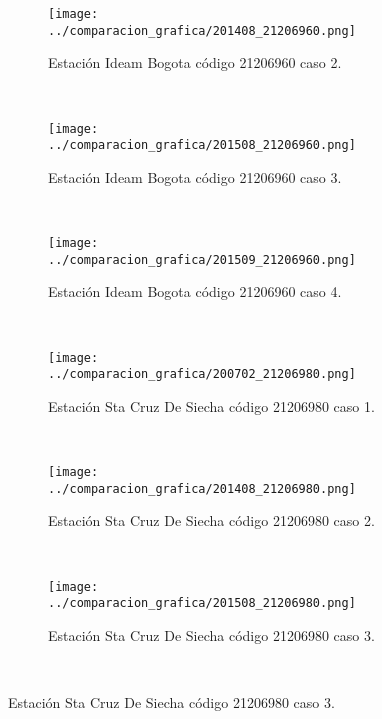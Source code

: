 \begin{figure}[H]
\centering
\begin{subfigure}[normla]{0.4\textwidth}
\caption{Estación Ideam Bogota código 21206960 caso 2.}
\texttt{[image: ../comparacion\_grafica/201408\_21206960.png]}
\end{subfigure}
~
\begin{subfigure}[normla]{0.4\textwidth}
\caption{Estación Ideam Bogota código 21206960 caso 3.}
\texttt{[image: ../comparacion\_grafica/201508\_21206960.png]}
\end{subfigure}
~
\begin{subfigure}[normla]{0.4\textwidth}
\caption{Estación Ideam Bogota código 21206960 caso 4.}
\texttt{[image: ../comparacion\_grafica/201509\_21206960.png]}
\end{subfigure}
~
\begin{subfigure}[normla]{0.4\textwidth}
\caption{Estación Sta Cruz De Siecha código 21206980 caso 1.}
\texttt{[image: ../comparacion\_grafica/200702\_21206980.png]}
\end{subfigure}
~
\begin{subfigure}[normla]{0.4\textwidth}
\caption{Estación Sta Cruz De Siecha código 21206980 caso 2.}
\texttt{[image: ../comparacion\_grafica/201408\_21206980.png]}
\end{subfigure}
~
\begin{subfigure}[normla]{0.4\textwidth}
\caption{Estación Sta Cruz De Siecha código 21206980 caso 3.}
\texttt{[image: ../comparacion\_grafica/201508\_21206980.png]}
\end{subfigure}
~
\end{figure}
           
